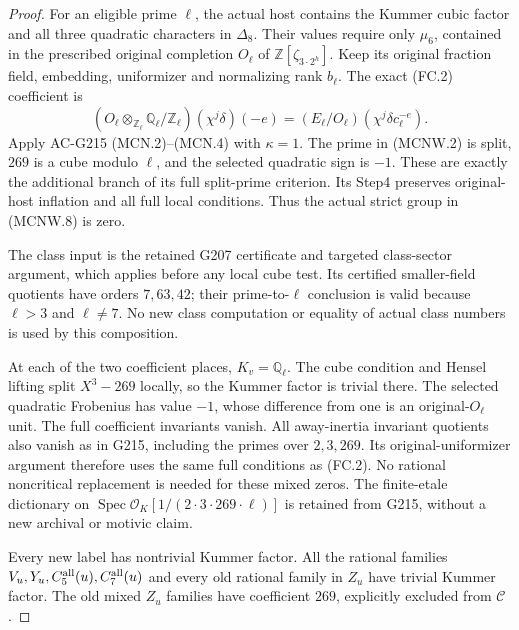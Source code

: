 \begin{proof}
For an eligible prime $\ell$, the actual host contains the
Kummer cubic factor and all three quadratic characters in $\Delta_8$.
Their values require only $\mu_6$, contained in the prescribed
original completion $O_\ell$ of $\mathbb Z[\zeta_{3\cdot2^h}]$.
Keep its original fraction field, embedding, uniformizer and
normalizing rank $b_\ell$. The exact (FC.2) coefficient is
\[
 (O_\ell\otimes_{\mathbb Z_\ell}\mathbb Q_\ell/\mathbb Z_\ell)
                                      (\chi^j\delta)(-e)
       =(E_\ell/O_\ell)(\chi^j\delta c_\ell^{-e}).
 \tag{MCNW.8}
\]
Apply AC-G215 (MCN.2)--(MCN.4) with $\kappa=1$.
The prime in (MCNW.2) is split, $269$ is a cube modulo $\ell$,
and the selected quadratic sign is $-1$. These are exactly
the additional branch of its full split-prime criterion.
Its Step4 preserves original-host inflation and all full local
conditions. Thus the actual strict group in (MCNW.8) is zero.

The class input is the retained G207 certificate and targeted
class-sector argument, which applies before any local cube test.
Its certified smaller-field quotients have orders $7,63,42$;
their prime-to-$\ell$ conclusion is valid because $\ell>3$
and $\ell\ne7$. No new class computation or equality of actual
class numbers is used by this composition.

At each of the two coefficient places, $K_v=\mathbb Q_\ell$.
The cube condition and Hensel lifting split $X^3-269$ locally,
so the Kummer factor is trivial there. The selected quadratic
Frobenius has value $-1$, whose difference from one is an
original-$O_\ell$ unit. The full coefficient invariants vanish.
All away-inertia invariant quotients also vanish as in G215,
including the primes over $2,3,269$. Its original-uniformizer
argument therefore uses the same full conditions as (FC.2).
No rational noncritical replacement is needed for these mixed zeros.
The finite-etale dictionary on
$\operatorname{Spec}\mathcal O_K[1/(2\cdot3\cdot269\cdot\ell)]$
is retained from G215, without a new archival or motivic claim.

Every new label has nontrivial Kummer factor.
All the rational families $V_u,Y_u,C_5^{\rm all}(u),C_7^{\rm all}(u)$
and every old rational family in $Z_u$ have trivial Kummer factor.
The old mixed $Z_u$ families have coefficient $269$, explicitly
excluded from $\mathscr C$.


\end{proof}
